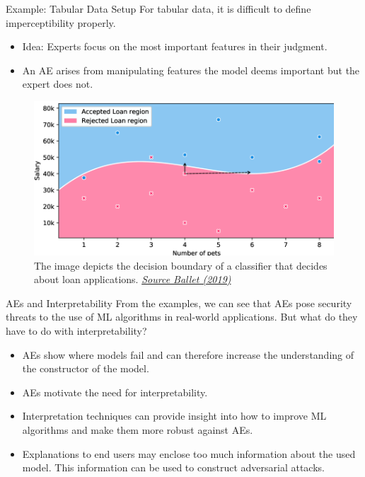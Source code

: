\documentclass[11pt,compress,t,notes=noshow, xcolor=table]{beamer}
\begin{document}
\begin{vbframe}{Example: Tabular Data Setup}
For tabular data, it is difficult to define imperceptibility properly.%
\begin{itemize}
    \item Idea: Experts focus on the most important features in their judgment.
    \item An AE arises from manipulating features the model deems important but the expert does not.
\end{itemize}
\begin{figure}[h]
\centering
\includegraphics[width=0.6\linewidth]{figure/AEloanApplication.png}
  \caption{The image depicts the decision boundary of a classifier that decides about loan applications. \href{https://arxiv.org/pdf/1911.03274.pdf}{\textit{Source Ballet (2019)}}}
  \label{fig:mnist}
\end{figure} 

\end{vbframe}

\begin{vbframe}{AEs and Interpretability}
From the examples, we can see that AEs pose security threats to the use of ML algorithms in real-world applications. But what do they have to do with interpretability?

\begin{itemize}
    \item AEs show where models fail and can therefore increase the understanding of the constructor of the model.
    \item AEs motivate the need for interpretability.
    \item Interpretation techniques can provide insight into how to improve ML algorithms and make them more robust against AEs.
    \item Explanations to end users may enclose too much information about the used model. This information can be used to construct adversarial attacks.
\end{itemize}
\end{vbframe}
\end{document}
